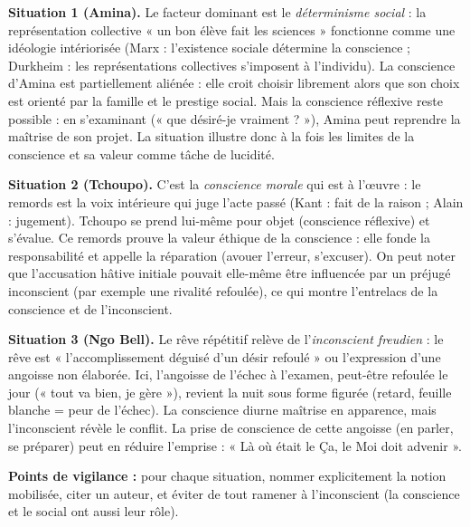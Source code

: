 \documentclass[11pt]{article}
\begin{document}
\begin{corrige}
\textbf{Situation 1 (Amina).} Le facteur dominant est le \emph{déterminisme social} : la représentation collective « un bon élève fait les sciences » fonctionne comme une idéologie intériorisée (Marx : l'existence sociale détermine la conscience ; Durkheim : les représentations collectives s'imposent à l'individu). La conscience d'Amina est partiellement aliénée : elle croit choisir librement alors que son choix est orienté par la famille et le prestige social. Mais la conscience réflexive reste possible : en s'examinant (« que désiré-je vraiment ? »), Amina peut reprendre la maîtrise de son projet. La situation illustre donc à la fois les limites de la conscience et sa valeur comme tâche de lucidité.

\textbf{Situation 2 (Tchoupo).} C'est la \emph{conscience morale} qui est à l'œuvre : le remords est la voix intérieure qui juge l'acte passé (Kant : fait de la raison ; Alain : jugement). Tchoupo se prend lui-même pour objet (conscience réflexive) et s'évalue. Ce remords prouve la valeur éthique de la conscience : elle fonde la responsabilité et appelle la réparation (avouer l'erreur, s'excuser). On peut noter que l'accusation hâtive initiale pouvait elle-même être influencée par un préjugé inconscient (par exemple une rivalité refoulée), ce qui montre l'entrelacs de la conscience et de l'inconscient.

\textbf{Situation 3 (Ngo Bell).} Le rêve répétitif relève de l'\emph{inconscient freudien} : le rêve est « l'accomplissement déguisé d'un désir refoulé » ou l'expression d'une angoisse non élaborée. Ici, l'angoisse de l'échec à l'examen, peut-être refoulée le jour (« tout va bien, je gère »), revient la nuit sous forme figurée (retard, feuille blanche = peur de l'échec). La conscience diurne maîtrise en apparence, mais l'inconscient révèle le conflit. La prise de conscience de cette angoisse (en parler, se préparer) peut en réduire l'emprise : « Là où était le Ça, le Moi doit advenir ».

\textbf{Points de vigilance :} pour chaque situation, nommer explicitement la notion mobilisée, citer un auteur, et éviter de tout ramener à l'inconscient (la conscience et le social ont aussi leur rôle).
\end{corrige}
\end{document}
